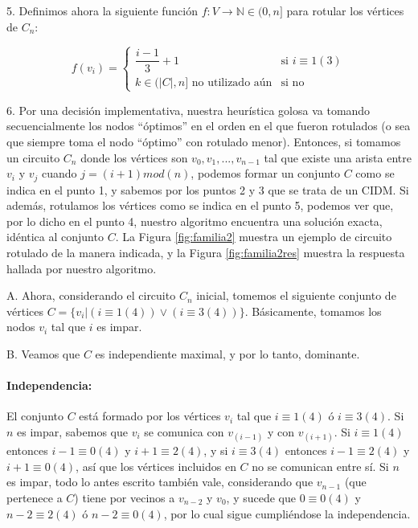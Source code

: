 5. Definimos ahora la siguiente función $f:V \rightarrow \mathbb{N} \in (0,n]$ para rotular los vértices de $C_n$:

\begin{equation*}
f(v_i) = \begin{cases}
\dfrac{i-1}{3}+1 & \text{si } i \equiv 1 (3)\\
k \in (|C|,n] \text{ no utilizado aún} & \text{si no}
\end{cases}
\end{equation*}

6. Por una decisión implementativa, nuestra heurística golosa va tomando secuencialmente los nodos ``óptimos'' en el orden en el que fueron rotulados (o sea que siempre toma el nodo ``óptimo'' con rotulado menor). Entonces, si tomamos un circuito $C_n$ donde los vértices son $v_0,v_1,...,v_{n-1}$ tal que existe una arista entre $v_i$ y $v_j$ cuando $j = (i+1) mod (n)$, podemos formar un conjunto $C$ como se indica en el punto 1, y sabemos por los puntos 2 y 3 que se trata de un CIDM.  Si además, rotulamos los vértices como se indica en el punto 5, podemos ver que, por lo dicho en el punto 4, nuestro algoritmo encuentra una solución exacta, idéntica al conjunto $C$. La Figura \ref{fig:familia2} muestra un ejemplo de circuito rotulado de la manera indicada, y la Figura \ref{fig:familia2res} muestra la respuesta hallada por nuestro algoritmo.


A. Ahora, considerando el circuito $C_n$ inicial, tomemos el siguiente conjunto de vértices $C = \{v_i |(i \equiv 1 (4)) \vee (i \equiv 3 (4))\}$.  Básicamente, tomamos los nodos $v_i$ tal que $i$ es impar.

B. Veamos que $C$ es independiente maximal, y por lo tanto, dominante.

\paragraph*{Independencia:} El conjunto $C$ está formado por los vértices $v_i$ tal que $i \equiv 1 (4)$ ó $i \equiv 3 (4)$. Si $n$ es impar, sabemos que $v_i$ se comunica con $v_{(i-1)}$ y con $v_{(i+1)}$. Si $i \equiv 1 (4)$ entonces $i-1 \equiv 0 (4)$ y $i+1 \equiv 2 (4)$, y si $i \equiv 3 (4)$ entonces $i-1 \equiv 2 (4)$ y $i+1 \equiv 0 (4)$, así que los vértices incluidos en $C$ no se comunican entre sí. Si $n$ es impar, todo lo antes escrito también vale, considerando que $v_{n-1}$ (que pertenece a $C$) tiene por vecinos a $v_{n-2}$ y $v_{0}$, y sucede que $0 \equiv 0 (4)$ y $n-2 \equiv 2 (4)$ ó $n-2 \equiv 0 (4)$, por lo cual sigue cumpliéndose la independencia.

